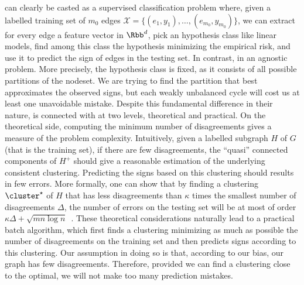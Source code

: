 \esp{} can clearly be casted as a supervised classification problem where, given a labelled training
set of $m_0$ edges $\mathcal{X}=\{(e_1, y_1), \ldots, (e_{m_0}, y_{m_0})\}$, we can extract for
every edge a feature vector in $\Rbb^d$, pick an hypothesis class like linear models, find among
this class the hypothesis minimizing the empirical risk, and use it to predict the sign of edges in
the testing set. In contrast, \pcc{} in an agnostic problem. More precisely, the hypothesis class is
fixed, as it consists of all possible partitions of the nodeset. We are trying to find the partition
that best approximates the observed signs, but each weakly unbalanced cycle will cost us at
least one unavoidable mistake. Despite this fundamental difference in their nature, \pcc{} is
connected with \esp{} at two levels, theoretical and practical. On the theoretical side, computing
the minimum number of disagreements gives a measure of the \esp{} problem complexity.  Intuitively,
given a labelled subgraph $H$ of $G$ (that is the training set), if there are few disagreements, the
\enquote{quasi} connected components of $H^+$ should give a reasonable estimation of the underlying
consistent clustering. Predicting the signs based on this clustering should results in few errors.
More formally, one can show that by finding a clustering $\cluster^\star$ of $H$ that has less
disagreements than $\kappa$ times the smallest number of disagreements $\Delta$, the number of
errors on the testing set will be at most of order $\kappa\Delta + \sqrt{mn\log
n}$~\autocite[Theorem 6]{Cesa-Bianchi2012b}. These theoretical considerations naturally lead to
a practical batch algorithm, which first finds a clustering minimizing as much as possible the number
of disagreements on the training set and then predicts signs according to this clustering. Our
assumption in doing so is that, according to our bias, our graph has few disagreements. Therefore,
provided we can find a clustering close to the optimal, we will not make too many prediction
mistakes.

\bigskip

